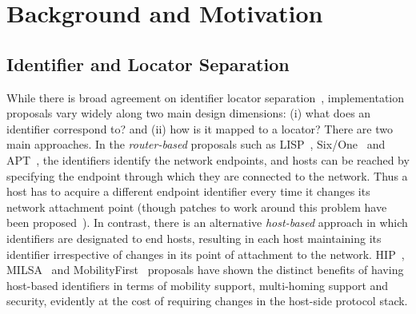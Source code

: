 \section{Background and Motivation}
\label{sec:overview}

\subsection{Identifier and Locator Separation}

While there is broad agreement on identifier locator separation~\cite{saltzer,li},
implementation proposals vary widely along two main design
dimensions: (i) what does an identifier correspond to? and (ii) how is it
mapped to a locator? There are two main approaches.  In the
\emph{router-based} proposals such as LISP~\cite{farinacci},
Six/One~\cite{vogt-08} and APT~\cite{jen-apt-08}, the identifiers
identify
the network endpoints, and hosts can be reached by specifying the
endpoint through which they are connected to the network. Thus 
a host has to acquire a different endpoint identifier every time it
changes its network attachment point (though
patches to work around this problem have been
proposed~\cite{farinacci-mn}). In contrast, there is an alternative
\emph{host-based} approach in which identifiers are designated to
end hosts, resulting in each host maintaining its identifier
irrespective of changes in its point of attachment to the network.
HIP~\cite{moskowitz}, MILSA~\cite{milsa} and MobilityFirst~\cite{mobilityFirst} proposals have
shown the distinct benefits of having host-based identifiers in terms of
mobility support, multi-homing support and security, evidently at the
cost of requiring changes in the host-side protocol stack.


